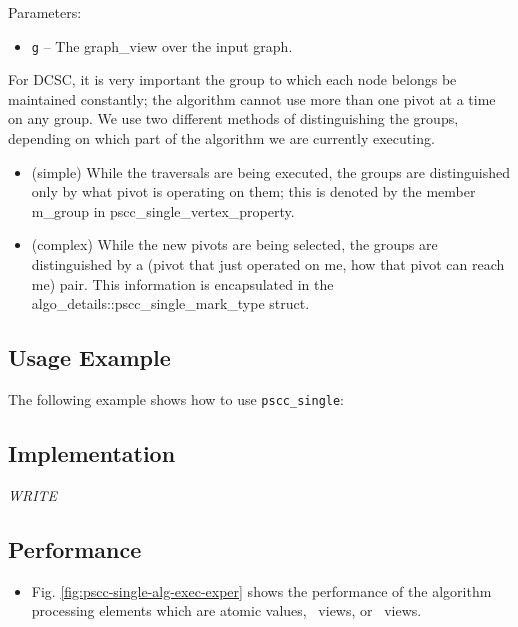 Parameters:
\begin{itemize}
\item
\texttt{g} --
The graph\_view over the input graph.
\end{itemize}

For DCSC, it is very important the group to which each node belongs be maintained constantly; the algorithm cannot use more than one pivot at a time on any group. We use two different methods of distinguishing the groups, depending on which part of the algorithm we are currently executing.

\begin{itemize}
\item
(simple) While the traversals are being executed, the groups are distinguished only by what pivot is operating on them; this is denoted by the member m\_group in pscc\_single\_vertex\_property.
\item
(complex) While the new pivots are being selected, the groups are distinguished by a (pivot that just operated on me, how that pivot can reach me) pair. This information is encapsulated in the algo\_details::pscc\_single\_mark\_type struct.
\end{itemize}

\subsection{Usage Example} \label{sec-pscc-single-alg-use}

The following example shows how to use
\texttt{pscc\_single}:


\subsection{Implementation} \label{sec-pscc-single-alg-impl}

\textit{WRITE}

\subsection{Performance} \label{sec-pscc-single-alg-perf}

\begin{itemize}
\item
Fig. \ref{fig:pscc-single-alg-exec-exper}
shows the performance of the algorithm processing
elements which are atomic values, \stl\ views, or \stapl\ views.
\end{itemize}

